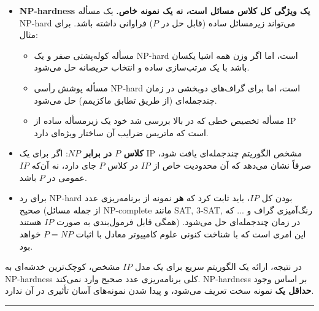 \documentclass[11pt,a4paper]{article}
\newcommand{\en}[1]{\textenglish{#1}}
\newcommand{\thickseparator}{\vspace{1em}\noindent\rule{\linewidth}{1pt}\vspace{1em}}
\begin{document}
\begin{itemize}
\item \textbf{\en{NP-hardness} یک ویژگی کل کلاس مسائل است، نه یک نمونه خاص.} یک مسأله \en{NP-hard} می‌تواند زیرمسائل ساده (قابل حل در $P$) فراوانی داشته باشد. برای مثال:
\begin{itemize}
\item مسأله کوله‌پشتی صفر و یک \en{NP-hard} است، اما اگر وزن همه اشیا یکسان باشد با یک مرتب‌سازی ساده و انتخاب حریصانه حل می‌شود.
\item مسأله پوشش رأسی \en{NP-hard} است، اما برای گراف‌های دوبخشی در زمان چندجمله‌ای (از طریق تطابق ماکزیمم) حل می‌شود.
\item مسأله تخصیص خطی که در بالا بررسی شد خود یک زیرمسأله ساده از \en{IP} است که ماتریس ضرایب آن ساختار ویژه‌ای دارد.
\end{itemize}
\item \textbf{کلاس $P$ در برابر $NP$}: اگر برای یک \en{IP} مشخص الگوریتم چندجمله‌ای یافت شود، صرفاً نشان می‌دهد که آن محدودیت خاص از $IP$ در کلاس $P$ جای دارد، نه آن‌که $IP$ عمومی در $P$ باشد.
\item برای رد \en{NP-hard} بودن کل $IP$، باید ثابت کرد که \textbf{هر} نمونه از برنامه‌ریزی عدد صحیح (از جمله مسائل \en{NP-complete} مانند \en{SAT}, \en{3-SAT}, رنگ‌آمیزی گراف و ... که همگی قابل فرمول‌بندی به صورت $IP$ هستند) در زمان چندجمله‌ای حل می‌شود. این امری است که با شناخت کنونی علوم کامپیوتر معادل با اثبات $P=NP$ خواهد بود.
\end{itemize}

در نتیجه، ارائه یک الگوریتم سریع برای یک مدل $IP$ مشخص، کوچک‌ترین خدشه‌ای به \en{NP-hardness} کلی برنامه‌ریزی عدد صحیح وارد نمی‌کند. \en{NP-hardness} بر اساس وجود \textbf{حداقل یک} نمونه سخت تعریف می‌شود، و پیدا شدن نمونه‌های آسان تأثیری در آن ندارد.

\thickseparator
\end{document}

